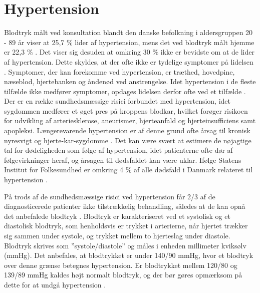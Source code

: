 \section{Hypertension} \label{sec:hypertension}

Blodtryk målt ved konsultation blandt den danske befolkning i aldersgruppen 20 - 89 år viser at 25,7 \% lider af hypertension, mens det ved blodtryk målt hjemme er 22,3 \% . Det viser sig desuden at omkring 30 \% ikke er bevidste om at de lider af hypertension. Dette skyldes, at der ofte ikke er tydelige symptomer på lidelsen \cite{kronborg2008}. Symptomer, der kan forekomme ved hypertension, er træthed, hovedpine, næseblod, hjertebanken og åndenød ved anstrengelse. Idet hypertension i de fleste tilfælde ikke medfører symptomer, opdages lidelsen derfor ofte ved et tilfælde \cite{olsen2015}.
Der er en række sundhedsmæssige risici forbundet med hypertension, idet sygdommen medfører et øget pres på kroppens blodkar, hvilket forøger risikoen for udvikling af arteriesklerose, aneurismer, hjerteanfald og hjerteinsufficiens samt apopleksi. Længerevarende hypertension er af denne grund ofte årsag til kronisk nyresvigt og hjerte-kar-sygdomme \cite{martini2015}. Det kan være svært at estimere de nøjagtige tal for dødeligheden som følge af hypertension, idet patienterne ofte dør af følgevirkninger heraf, og årsagen til dødsfaldet kan være uklar. Ifølge Statens Institut for Folkesundhed er omkring 4 \% af alle dødsfald i Danmark relateret til hypertension \cite{juel2006}.
 
På trods af de sundhedsmæssige risici ved hypertension får 2/3 af de diagnosticerede patienter ikke tilstrækkelig behandling, således at de kan opnå det anbefalede blodtryk \cite{paulsen2012}.
Blodtryk er karakteriseret ved et systolisk og et diastolisk blodtryk, som henholdsvis er trykket i arterierne, når hjertet trækker sig sammen under systole, og trykket mellem to hjerteslag under diastole. Blodtryk skrives som ”systole/diastole” og måles i enheden millimeter kviksølv (mmHg). Det anbefales, at blodtrykket er under 140/90 mmHg, hvor et blodtryk over denne grænse betegnes hypertension. Er blodtrykket mellem 120/80 og 139/89 mmHg kaldes højt normalt blodtryk, og der bør gøres opmærksom på dette for at undgå hypertension \cite{martini2015}.

